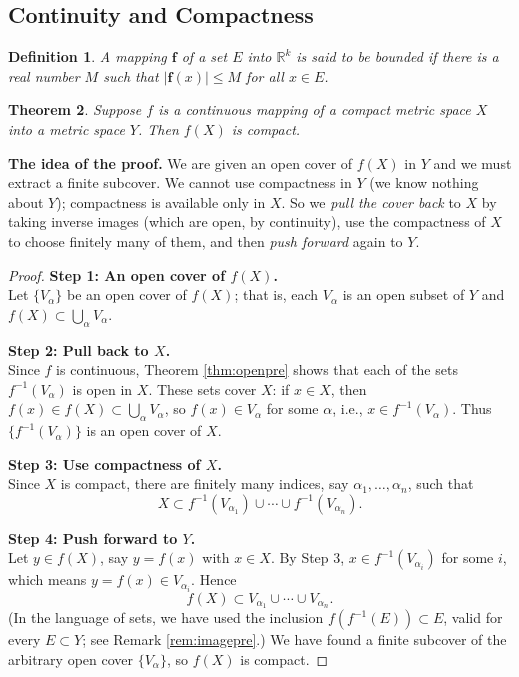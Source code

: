 \documentclass{article}
\theoremstyle{mythm}
\newtheorem{theorem}{Theorem}[section]
\newtheorem{definition}[theorem]{Definition}
\begin{document}
\subsection{Continuity and Compactness}

\begin{definition}\label{def:bounded}
A mapping $\mathbf{f}$ of a set $E$ into $\mathbb{R}^k$ is said to be \textit{bounded} if there is a real number $M$ such that $|\mathbf{f}(x)| \leq M$ for all $x \in E$.
\end{definition}

\begin{theorem}\label{thm:compactimage}
Suppose $f$ is a continuous mapping of a compact metric space $X$ into a metric space $Y$. Then $f(X)$ is compact.
\end{theorem}

\textbf{The idea of the proof.} We are given an open cover of $f(X)$ in $Y$ and we must extract a finite subcover. We cannot use compactness in $Y$ (we know nothing about $Y$); compactness is available only in $X$. So we \textit{pull the cover back} to $X$ by taking inverse images (which are open, by continuity), use the compactness of $X$ to choose finitely many of them, and then \textit{push forward} again to $Y$.

\begin{proof}
\textbf{Step 1: An open cover of $f(X)$.}\\
Let $\{V_\alpha\}$ be an open cover of $f(X)$; that is, each $V_\alpha$ is an open subset of $Y$ and $f(X) \subset \bigcup_\alpha V_\alpha$.

\textbf{Step 2: Pull back to $X$.}\\
Since $f$ is continuous, Theorem \ref{thm:openpre} shows that each of the sets $f^{-1}(V_\alpha)$ is open in $X$. These sets cover $X$: if $x \in X$, then $f(x) \in f(X) \subset \bigcup_\alpha V_\alpha$, so $f(x) \in V_\alpha$ for some $\alpha$, i.e., $x \in f^{-1}(V_\alpha)$. Thus $\{f^{-1}(V_\alpha)\}$ is an open cover of $X$.

\textbf{Step 3: Use compactness of $X$.}\\
Since $X$ is compact, there are finitely many indices, say $\alpha_1, \dots, \alpha_n$, such that
\[
X \subset f^{-1}(V_{\alpha_1}) \cup \cdots \cup f^{-1}(V_{\alpha_n}).
\]

\textbf{Step 4: Push forward to $Y$.}\\
Let $y \in f(X)$, say $y = f(x)$ with $x \in X$. By Step 3, $x \in f^{-1}(V_{\alpha_i})$ for some $i$, which means $y = f(x) \in V_{\alpha_i}$. Hence
\[
f(X) \subset V_{\alpha_1} \cup \cdots \cup V_{\alpha_n}.
\]
(In the language of sets, we have used the inclusion $f(f^{-1}(E)) \subset E$, valid for every $E \subset Y$; see Remark \ref{rem:imagepre}.) We have found a finite subcover of the arbitrary open cover $\{V_\alpha\}$, so $f(X)$ is compact.
\end{proof}
\end{document}

